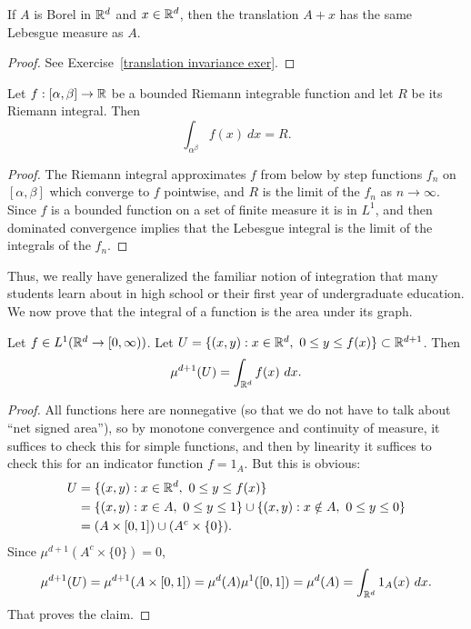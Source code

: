 \begin{theorem}\label{translation invariance in Rd}
If $A$ is Borel in $\mathbb{R}^{d}$ and $x \in \mathbb{R}^{d}$, then the translation $A + x$ has the same Lebesgue measure as $A$.
\end{theorem}
\begin{proof}
See Exercise~\ref{translation invariance exer}.
\end{proof}

\begin{theorem}
Let $f: [\alpha, \beta] \to \mathbb{R}$ be a bounded Riemann integrable function and let $R$ be its Riemann integral. Then
\[\int_{\alpha^{\beta}} f(x)~dx = R.\]
\end{theorem}
\begin{proof}
The Riemann integral approximates $f$ from below by step functions $f_{n}$ on $[\alpha, \beta]$ which converge to $f$ pointwise, and $R$ is the limit of the $f_{n}$ as $n \to \infty$.
Since $f$ is a bounded function on a set of finite measure it is in $L^{1}$, and then dominated convergence implies that the Lebesgue integral is the limit of the integrals of the $f_{n}$.
\end{proof}

Thus, we really have generalized the familiar notion of integration that many students learn about in high school or their first year of undergraduate education.
We now prove that the integral of a function is the area under its graph.

\begin{theorem}
Let $f \in L^{1}(\mathbb{R}^{d} \to [0, \infty))$.
Let $U = \{(x, y): x \in \mathbb{R}^{d}, ~0 \leq y \leq f(x)\} \subset \mathbb{R}^{d+1}$.
Then
\[\mu^{d+1}(U) = \int_{\mathbb{R}^{d}} f(x)~dx.\]
\end{theorem}
\begin{proof}
All functions here are nonnegative (so that we do not have to talk about ``net signed area''), so by monotone convergence and continuity of measure, it suffices to check this for simple functions, and then by linearity it suffices to check this for an indicator function $f = 1_{A}$.
But this is obvious:
\begin{align*}U &= \{(x, y): x \in \mathbb{R}^{d}, ~0 \leq y \leq f(x)\} \\&= \{(x, y): x \in A, ~0 \leq y \leq 1\} \cup \{(x, y): x \notin A, ~0 \leq y \leq 0\} \\&= (A \times [0, 1]) \cup (A^{c} \times \{0\}).\end{align*}
Since $\mu^{d+1}(A^{c} \times \{0\}) = 0$,
\[\mu^{d+1}(U) = \mu^{d+1}(A \times [0, 1]) = \mu^{d}(A) \mu^{1}([0, 1]) = \mu^{d}(A) = \int_{\mathbb{R}^{d}} 1_{A}(x)~dx.\]
That proves the claim.
\end{proof}

